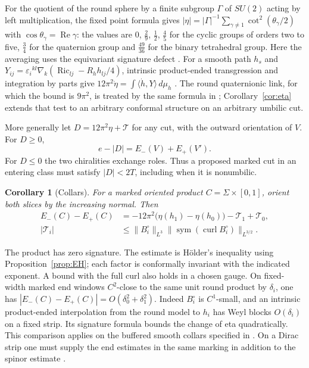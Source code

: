 \documentclass[11pt,letterpaper]{article}
\numberwithin{equation}{section}
\newtheorem{corollary}[theorem]{Corollary}
\theoremstyle{definition}
\DeclareMathOperator{\Ric}{Ric}
\DeclareMathOperator{\curl}{curl}
\newcommand{\cT}{\mathcal T}
\begin{document}
For the quotient of the round sphere by a finite subgroup \(\Gamma\) of
\(SU(2)\) acting by left multiplication, the fixed point formula gives
\(|\eta|=|\Gamma|^{-1}\sum_{\gamma\ne1}\cot^2(\theta_\gamma/2)\) with
\(\cos\theta_\gamma=\operatorname{Re}\gamma\): the values are \(0\),
\(\tfrac29\), \(\tfrac12\), \(\tfrac45\) for the cyclic groups of orders
two to five, \(\tfrac34\) for the quaternion group and \(\tfrac{49}{36}\)
for the binary tetrahedral group. Here the averaging uses the equivariant signature defect
\cite[Proposition 2.12 and its application]{APS1975SpectralII}.
For a smooth path \(h_s\) and
\(Y_{ij}=\varepsilon_i{}^{kl}\nabla_k(\Ric_{lj}-R_hh_{lj}/4)\),
intrinsic product-ended transgression and integration by parts give
\(12\pi^2\dot\eta=\int\langle\dot h,Y\rangle\,d\mu_h\)
\cite[LED, eta variation]{Baker2026MarkedCutCalculations}.
The round quaternionic link, for which
the bound is \(9\pi^2\), is treated by the same formula in
\cite{Baker2026MarkedNecks}; Corollary~\ref{cor:eta} extends that test to
an arbitrary conformal structure on an arbitrary umbilic cut.

More generally let \(D=12\pi^2\eta+\cT\) for any cut, with the
outward orientation of \(V\). For \(D\ge0\),
\[
                 e-|D|=E_-(V)+E_+(V').
\]
For \(D\le0\) the two chiralities exchange roles. Thus a proposed marked
cut in an entering class must satisfy \(|D|<2T\), including when it is
nonumbilic.

\begin{corollary}[Collars]\label{cor:collar}
For a marked oriented product \(C=\Sigma\times[0,1]\), orient both
slices by the increasing normal. Then
\begin{align*}
 E_-(C)-E_+(C)&=-12\pi^2\big(\eta(h_1)-\eta(h_0)\big)
                       -\cT_1+\cT_0,\\
 |\cT_i|&\le\|B_i^\circ\|_{L^3}
       \|\operatorname{sym}(\curl B_i^\circ)\|_{L^{3/2}}.
\end{align*}
\end{corollary}
The product has zero signature. The estimate is H\"older's inequality
using Proposition~\ref{prop:EH}; each factor is conformally invariant
with the indicated exponent. A bound with the full curl also holds in
a chosen gauge. On fixed-width marked end windows \(C^2\)-close to the
same unit round product by \(\delta_i\), one has
\(|E_-(C)-E_+(C)|=O(\delta_0^2+\delta_1^2)\). Indeed \(B_i^\circ\) is
\(C^1\)-small, and an intrinsic product-ended interpolation from the
round model to \(h_i\) has Weyl blocks \(O(\delta_i)\) on a fixed
strip. Its signature formula bounds the change of eta quadratically.
This comparison applies on the buffered smooth collars specified in
\cite{Baker2026MarkedNecks,Baker2026BourAttainment}. On a Dirac strip
one must supply the end estimates in the same marking in addition to the
spinor estimate \cite{Baker2026DiracTransmission}.
\end{document}
